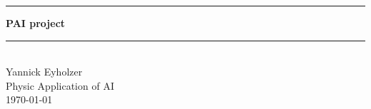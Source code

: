 \documentclass[a4paper, 11pt]{article}
\date{\Large{ \today}}
\newcommand{\Title}{PAI project}
\begin{document}
    
    
    
    
    
    \thispagestyle{empty}       
    \newcommand{\code}[1]{\colorbox{light-gray}{\texttt{#1}}}
    
    
    \begin{titlepage}
    	
    
    	
    	\centering
    	\rule{\linewidth}{1mm}
    	\huge{\textbf{\Title}} \\
    	\vspace{-3mm}
    	\rule{\linewidth}{1mm}
    	\\[1cm]
    	\large{Yannick Eyholzer}
    	\\[1cm]
    	\large{Physic Application of AI}
    	\\[1cm]
    	
    	\today
    	
%    	
    	

\end{titlepage}
\end{document}
